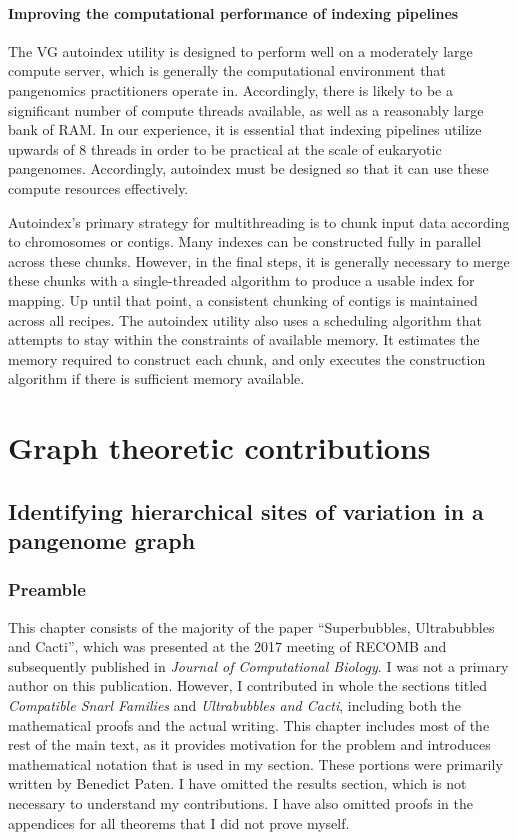\documentclass[11pt]{ucthesis}
\begin{document}
\subsection{Improving the computational performance of indexing pipelines}

The VG autoindex utility is designed to perform well on a moderately large compute server, which is generally the computational environment that pangenomics practitioners operate in. Accordingly, there is likely to be a significant number of compute threads available, as well as a reasonably large bank of RAM. In our experience, it is essential that indexing pipelines utilize upwards of 8 threads in order to be practical at the scale of eukaryotic pangenomes. Accordingly, autoindex must be designed so that it can use these compute resources effectively.

Autoindex's primary strategy for multithreading is to chunk input data according to chromosomes or contigs. Many indexes can be constructed fully in parallel across these chunks. However, in the final steps, it is generally necessary to merge these chunks with a single-threaded algorithm to produce a usable index for mapping. Up until that point, a consistent chunking of contigs is maintained across all recipes. The autoindex utility also uses a scheduling algorithm that attempts to stay within the constraints of available memory. It estimates the memory required to construct each chunk, and only executes the construction algorithm if there is sufficient memory available.


\part{Graph theoretic contributions}

\chapter{Identifying hierarchical sites of variation in a pangenome graph}
\label{chapter:snarls}

\section{Preamble}

This chapter consists of the majority of the paper ``Superbubbles, Ultrabubbles and Cacti'', which was presented at the 2017 meeting of RECOMB and subsequently published in \emph{Journal of Computational Biology}\cite{paten2018superbubbles}. I was not a primary author on this publication. However, I contributed in whole the sections titled \emph{Compatible Snarl Families} and \emph{Ultrabubbles and Cacti}, including both the mathematical proofs and the actual writing. This chapter includes most of the rest of the main text, as it provides motivation for the problem and introduces mathematical notation that is used in my section. These portions were primarily written by Benedict Paten. I have omitted the results section, which is not necessary to understand my contributions. I have also omitted proofs in the appendices for all theorems that I did not prove myself. 
\end{document}
